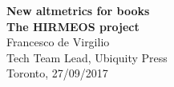 \documentclass[xcolor=svgnames]{beamer}
\begin{document}

    \begin{frame}
        \begin{center}
            \color{RoyalBlue}
            \textbf{
                \Huge{New altmetrics for books}\\
                \Large{The HIRMEOS project}\\
            }
            \vspace{40pt}
            Francesco de Virgilio\\
            \vspace{8pt}
            \scriptsize{Tech Team Lead, Ubiquity Press}\\
            \scriptsize{Toronto, 27/09/2017}
        \end{center}
    \end{frame}
\end{document}
